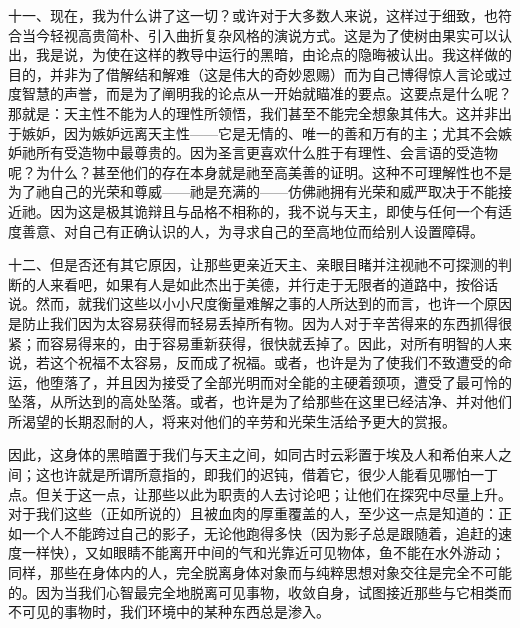 十一、现在，我为什么讲了这一切？或许对于大多数人来说，这样过于细致，也符合当今轻视高贵简朴、引入曲折复杂风格的演说方式。这是为了使树由果实可以认出，我是说，为使在这样的教导中运行的黑暗，由论点的隐晦被认出。我这样做的目的，并非为了借解结和解难（这是伟大的奇妙恩赐）而为自己博得惊人言论或过度智慧的声誉，而是为了阐明我的论点从一开始就瞄准的要点。这要点是什么呢？那就是：天主性不能为人的理性所领悟，我们甚至不能完全想象其伟大。这并非出于嫉妒，因为嫉妒远离天主性——它是无情的、唯一的善和万有的主；尤其不会嫉妒祂所有受造物中最尊贵的。因为圣言更喜欢什么胜于有理性、会言语的受造物呢？为什么？甚至他们的存在本身就是祂至高美善的证明。这种不可理解性也不是为了祂自己的光荣和尊威——祂是充满的——仿佛祂拥有光荣和威严取决于不能接近祂。因为这是极其诡辩且与品格不相称的，我不说与天主，即使与任何一个有适度善意、对自己有正确认识的人，为寻求自己的至高地位而给别人设置障碍。\par

十二、但是否还有其它原因，让那些更亲近天主、亲眼目睹并注视祂不可探测的判断的人来看吧，如果有人是如此杰出于美德，并行走于无限者的道路中，按俗话说。然而，就我们这些以小小尺度衡量难解之事的人所达到的而言，也许一个原因是防止我们因为太容易获得而轻易丢掉所有物。因为人对于辛苦得来的东西抓得很紧；而容易得来的，由于容易重新获得，很快就丢掉了。因此，对所有明智的人来说，若这个祝福不太容易，反而成了祝福。或者，也许是为了使我们不致遭受的命运，他堕落了，并且因为接受了全部光明而对全能的主硬着颈项，遭受了最可怜的坠落，从所达到的高处坠落。或者，也许是为了给那些在这里已经洁净、并对他们所渴望的长期忍耐的人，将来对他们的辛劳和光荣生活给予更大的赏报。\par

因此，这身体的黑暗置于我们与天主之间，如同古时云彩置于埃及人和希伯来人之间；这也许就是所谓所意指的，即我们的迟钝，借着它，很少人能看见哪怕一丁点。但关于这一点，让那些以此为职责的人去讨论吧；让他们在探究中尽量上升。对于我们这些（正如所说的）且被血肉的厚重覆盖的人，至少这一点是知道的：正如一个人不能跨过自己的影子，无论他跑得多快（因为影子总是跟随着，追赶的速度一样快），又如眼睛不能离开中间的气和光靠近可见物体，鱼不能在水外游动；同样，那些在身体内的人，完全脱离身体对象而与纯粹思想对象交往是完全不可能的。因为当我们心智最完全地脱离可见事物，收敛自身，试图接近那些与它相类而不可见的事物时，我们环境中的某种东西总是渗入。\par

